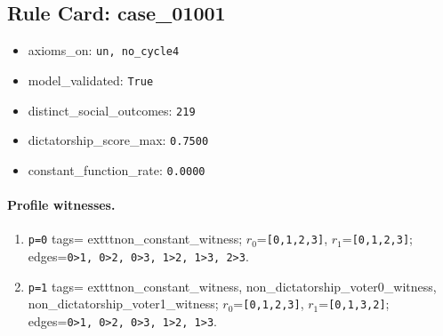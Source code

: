 \subsection*{Rule Card: case\_01001}
\begin{itemize}
\item axioms\_on: \texttt{un, no\_cycle4}
\item model\_validated: \texttt{True}
\item distinct\_social\_outcomes: \texttt{219}
\item dictatorship\_score\_max: \texttt{0.7500}
\item constant\_function\_rate: \texttt{0.0000}
\end{itemize}
\paragraph{Profile witnesses.}
\begin{enumerate}
\item \texttt{p=0} tags=	exttt{non\_constant\_witness}; $r_0$=\texttt{[0,1,2,3]}, $r_1$=\texttt{[0,1,2,3]}; edges=\texttt{0>1, 0>2, 0>3, 1>2, 1>3, 2>3}.
\item \texttt{p=1} tags=	exttt{non\_constant\_witness, non\_dictatorship\_voter0\_witness, non\_dictatorship\_voter1\_witness}; $r_0$=\texttt{[0,1,2,3]}, $r_1$=\texttt{[0,1,3,2]}; edges=\texttt{0>1, 0>2, 0>3, 1>2, 1>3}.
\end{enumerate}
